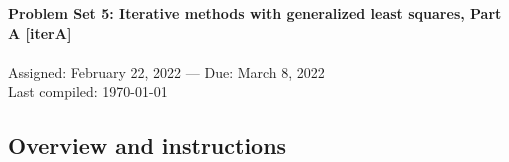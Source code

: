 \documentclass[11pt,titlepage,fleqn]{article}
\begin{document}
 

\begin{spacing}{1.2}
\centering
{\large \bf Problem Set 5: Iterative methods with generalized least squares, Part A [iterA]} \\
\cltag\ \\
Assigned: February 22, 2022 --- Due: March 8, 2022 \\
Last compiled: \today
\end{spacing}


\subsection*{Overview and instructions}
\end{document}
